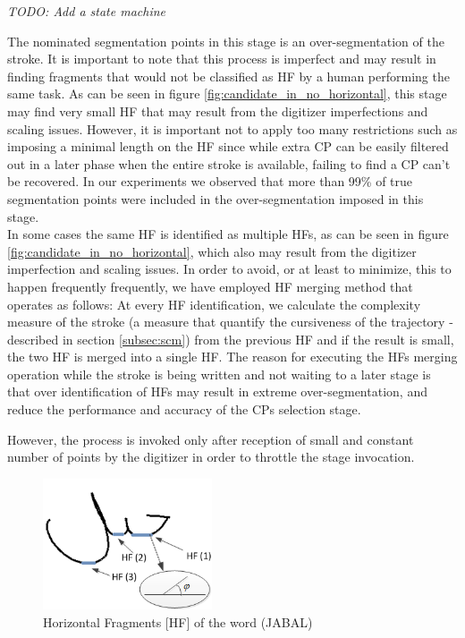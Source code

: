 \documentclass[journal,compsoc]{IEEEtran}
\begin{document}

\emph{TODO: Add a state machine}

The nominated segmentation points in this stage is an over-segmentation of the stroke. It is important to note that this process is imperfect and may result in finding fragments that would not be classified as HF by a human performing the same task. As can be seen in figure \ref{fig:candidate_in_no_horizontal}, this stage may find very small HF that may result from the digitizer imperfections and scaling issues. However, it is important not to apply too many restrictions such as imposing a minimal length on the HF since while extra CP can be easily filtered out in a later phase when the entire stroke is available, failing to find a CP can't be recovered. In our experiments we observed that more than 99\% of true segmentation points were included in the over-segmentation imposed in this stage.\\

In some cases the same HF is identified as multiple HFs, as can be seen in figure \ref{fig:candidate_in_no_horizontal}, which also may result from the digitizer imperfection and scaling issues. In order to avoid, or at least to minimize, this to happen frequently frequently, we have employed HF merging method that operates as follows: At every HF identification, we calculate the complexity measure of the stroke (a measure that quantify the cursiveness of the trajectory - described in section \ref{subsec:scm}) from the previous HF and if the result is small, the two HF is merged into a single HF. The reason for executing the HFs merging operation while the stroke is being written and not waiting to a later stage is that over identification of HFs may result in extreme over-segmentation, and reduce the performance and accuracy of the CPs selection stage.

However, the process is invoked only after reception of small and constant number of points by the digitizer in order to throttle the stage invocation.

\begin{figure}
\centering
\includegraphics[width=5cm]{./figures/horizontal_fragments}
\caption{Horizontal Fragments [HF] of the word (JABAL)}
\label{fig:horizontal_fragments}
\end{figure}
\end{document}
